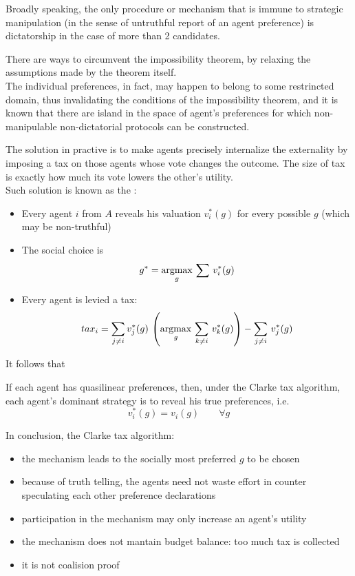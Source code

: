 Broadly speaking, the only procedure or mechanism that is immune to strategic manipulation (in the sense of untruthful report of an agent preference) is dictatorship in the case of more than 2 candidates.

There are ways to circumvent the impossibility theorem, by relaxing the assumptions made by the theorem itself.\\
The individual preferences, in fact, may happen to belong to some restrincted domain, thus invalidating the conditions of the impossibility theorem, and it is known that there are island in the space of agent's preferences for which non-manipulable non-dictatorial protocols can be constructed.

The solution in practive is to make agents precisely internalize the externality by imposing a tax on those agents whose vote changes the outcome. The size of tax is exactly how much its vote lowers the other's utility.\\
Such solution is known as the :
\begin{itemize}
\item Every agent $i$ from $A$ reveals his valuation $v^*_i(g)$ for every possible $g$ (which may be non-truthful)
\item The social choice is 
\[g^* =\operatorname*{argmax}_g \, \sum \,v^*_i(g)\]
\item Every agent is levied a tax:
\[tax_i = \sum_{j\ne i} v^*_j(g)\,\left(\operatorname*{argmax}_g\, \sum _{k\ne i}\,v^*_k(g)\right) - \sum_{j\ne i}\,v^*_j(g)\]
\end{itemize}
It follows that
\begin{theorem}
If each agent has quasilinear preferences, then, under the Clarke tax algorithm, each agent's dominant strategy is to reveal his true preferences, i.e. 
\[v^*_i(g) = v_i(g) \qquad\forall g\]
\end{theorem}

In conclusion, the Clarke tax algorithm:
\begin{itemize}
\item the mechanism leads to the socially most preferred $g$ to be chosen
\item because of truth telling, the agents need not waste effort in counter speculating each other preference declarations
\item participation in the mechanism may only increase an agent's utility
\item the mechanism does not mantain budget balance: too much tax is collected
\item it is not coalision proof 
\end{itemize}


